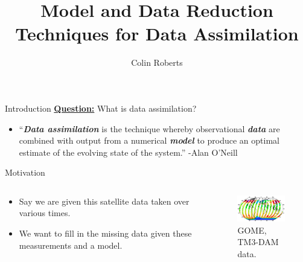 \documentclass[aspectratio=169]{beamer}
\author{Colin Roberts}
\title{Model and Data Reduction Techniques for Data Assimilation}
\newcommand\boldgreen[1]{\textcolor{lighter_csu_green}{\emph{\textbf{#1}}}}
\begin{document}

\begin{frame}{Introduction}
\pause
\vfill
\textbf{\underline{Question:}} What is data assimilation?
\begin{itemize}
    \pause
    \item ``\boldgreen{Data assimilation} is the technique whereby observational \boldgreen{data} are combined with output from a numerical \boldgreen{model} to produce an optimal estimate of the evolving state of the system.'' \quad -Alan O'Neill
\end{itemize}
\vfill
\end{frame}


\begin{frame}{Motivation}
    \vfill
    \begin{columns}
    \begin{column}{.49\textwidth}
    \begin{itemize}
        \pause
        \item Say we are given this satellite data taken over various times.
        \item We want to fill in the missing data given these measurements and a model.
    \end{itemize}
    \end{column}

 \begin{column}{.49\textwidth}
        \begin{figure}[h]
            \centering
            \includegraphics[width=40mm]{figures/gome_data.png}
            \caption{GOME, TM3-DAM data.}
        \end{figure}
 \end{column}
\end{columns}
\vfill
\end{frame}
\end{document}
